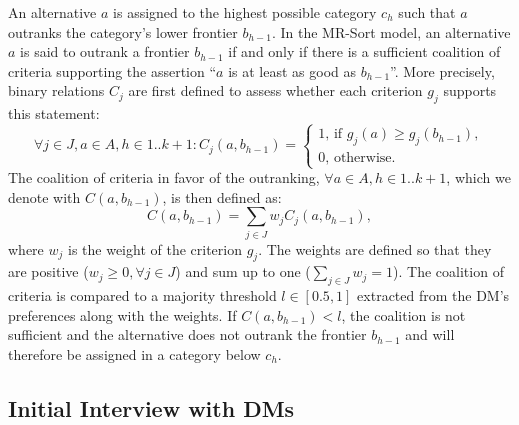 An alternative $a$ is assigned to the highest possible category $c_h$ such that $a$ outranks the category's lower frontier $b_{h-1}$. In the MR-Sort model, an alternative $a$ is said to outrank a frontier $b_{h-1}$ if and only if there is a sufficient coalition of criteria supporting the assertion ``$a$ is at least as good as $b_{h-1}$''. More precisely, 
binary relations $C_j$ are first defined to assess whether each criterion $g_j$ supports this statement:
\begin{equation}
	\forall j \in J, a \in A, h\in 1..k+1: C_j(a, b_{h-1}) =
\left\{\begin{array}{l}
 1 \mbox{, if } g_j(a) \geqslant g_j(b_{h-1}),\\
 0 \mbox{, otherwise.}
\end{array}\right.
\end{equation}
The coalition of criteria in favor of the outranking, $\forall a \in A, h\in 1..k+1$, which we denote with $C(a, b_{h-1})$, is then defined as:
\begin{equation}
	C(a, b_{h-1}) = \sum_{j \in J} w_j C_j(a, b_{h-1}),
\end{equation}
where $w_j$ is the weight of the criterion $g_j$. 
The weights are defined so that they are positive ($w_j \geqslant 0, \forall j\in J$) and sum up to one ($\sum_{j \in J} w_j = 1$). The coalition of criteria is compared to a majority threshold $l \in [0.5,1]$ extracted from the DM's preferences along with the weights. If $C(a, b_{h-1})<l$, the coalition is not sufficient and the alternative does not outrank the frontier $b_{h-1}$ and will therefore be assigned in a category below $c_h$.

\subsection{Initial Interview with DMs}\label{app:interview}

